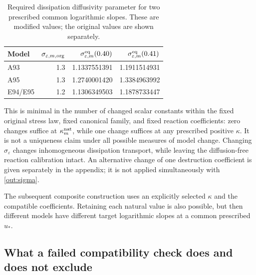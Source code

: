 \documentclass[11pt,a4paper]{article}
\numberwithin{equation}{section}
\newcommand{\eps}{\varepsilon}
\newcommand{\ust}{u_*}
\begin{document}
\begin{table}[htbp]
\centering
\caption{Required dissipation diffusivity parameter for two prescribed
common logarithmic slopes. These are modified values; the original
values are shown separately.}
\label{out:sigmatable}
\begin{tabular}{lrrr}
\toprule
Model & $\sigma_{\eps,m,\rm org}$
& $\sigma_{\eps,m}^{\rm eq}(0.40)$
& $\sigma_{\eps,m}^{\rm eq}(0.41)$\\
\midrule
A93 & 1.3 & 1.1337551391 & 1.1911514931\\
A95 & 1.3 & 1.2740001420 & 1.3384963992\\
E94/E95 & 1.2 & 1.1306349503 & 1.1878733447\\
\bottomrule
\end{tabular}
\end{table}

This is minimal in the number of changed scalar constants within the
fixed original stress law, fixed canonical family, and fixed reaction
coefficients: zero changes suffice at $\kappa_m^{\rm nat}$, while one
change suffices at any prescribed positive $\kappa$. It is not a
uniqueness claim under all possible measures of model change. Changing
$\sigma_\eps$ changes inhomogeneous dissipation transport, while leaving
the diffusion-free reaction calibration intact. An alternative change
of one destruction coefficient is given separately in the appendix;
it is not applied simultaneously with \cref{out:sigma}.

The subsequent composite construction uses an explicitly selected
$\kappa$ and the compatible coefficients. Retaining each natural value
is also possible, but then different models have different target
logarithmic slopes at a common prescribed $\ust$.

\subsection{What a failed compatibility check does and does not exclude}
\label{out:compatibilityscope}
\end{document}
